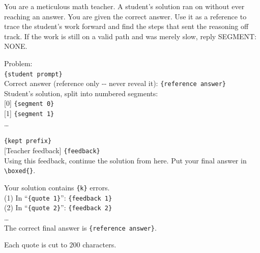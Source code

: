\begin{prompt}[title={$\mathcal{P}_{\text{critic}}^{\text{len}}$ --- first paragraph of $\mathcal{P}_{\text{critic}}$ for a rollout that reaches the length limit}]
You are a meticulous math teacher. A student's solution ran on without ever reaching an answer. You are given the correct answer. Use it as a reference to trace the student's work forward and find the steps that sent the reasoning off track. If the work is still on a valid path and was merely slow, reply SEGMENT: NONE.
\end{prompt}

\begin{prompt}[title={$\mathcal{P}_{\text{critic-user}}$ --- user message of the critic}]
Problem:\\
\texttt{\{student prompt\}}\\[4pt]
Correct answer (reference only {-}{-} never reveal it): \texttt{\{reference answer\}}\\[4pt]
Student's solution, split into numbered segments:\\[4pt]
{[}0{]} \texttt{\{segment 0\}}\\[4pt]
{[}1{]} \texttt{\{segment 1\}}\\[4pt]
\dots
\end{prompt}

\begin{prompt}[title={$\mathcal{P}_{\text{fb}}$ --- text appended to the kept prefix of the rollout}]
\texttt{\{kept prefix\}}\\[4pt]
{[}Teacher feedback{]} \texttt{\{feedback\}}\\[4pt]
Using this feedback, continue the solution from here. Put your final answer in \verb|\boxed{}|.
\end{prompt}

\begin{prompt}[title={\texttt{\{feedback\}} in $\mathcal{P}_{\text{fb}}$ when the critic lists $k > 1$ errors; for $k = 1$, the lines before the last line are only \texttt{\{feedback 1\}}}]
Your solution contains \texttt{\{k\}} errors.\\
(1) In ``\texttt{\{quote 1\}}'': \texttt{\{feedback 1\}}\\
(2) In ``\texttt{\{quote 2\}}'': \texttt{\{feedback 2\}}\\
\dots\\
The correct final answer is \texttt{\{reference answer\}}.
\end{prompt}

Each quote is cut to $200$ characters.

